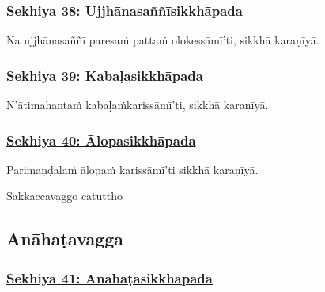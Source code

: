 \subsubsection*{\hyperref[training38]{Sekhiya 38: Ujjhānasaññīsikkhāpada}}
\label{sekh38}

Na ujjhānasaññī paresaṁ pattaṁ olokessāmī'ti, sikkhā karaṇīyā.



\subsubsection*{\hyperref[training39]{Sekhiya 39: Kabaḷasikkhāpada}}
\label{sekh39}

N'ātimahantaṁ kabaḷaṁ\makeatletter\hyperlink{endnote492-appendix}\makeatother \thinspace karissāmī'ti, sikkhā karaṇīyā.



\subsubsection*{\hyperref[training40]{Sekhiya 40: Ālopasikkhāpada}}
\label{sekh40}

Parimaṇḍalaṁ ālopaṁ karissāmī'ti sikkhā karaṇīyā.

\begin{center}
	Sakkaccavaggo catuttho\makeatletter\hyperlink{endnote493-appendix}\makeatother \thinspace
\end{center}



\subsection{Anāhaṭavagga}

\subsubsection*{\hyperref[training41]{Sekhiya 41: Anāhaṭasikkhāpada}}
\label{sekh41}

